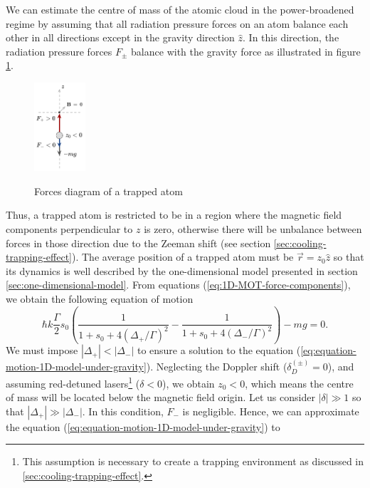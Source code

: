 We can estimate the centre of mass of the atomic cloud in the power-broadened regime by assuming that all radiation pressure forces on an atom balance each other in all directions except in the gravity direction $ \hat{z} $. In this direction, the radiation pressure forces $ F_{\pm} $ balance with the gravity force as illustrated in figure \ref{fig:forces-diagram-trapped-atom-nMOT-power-broadened-regime}.
\begin{figure}[!ht]
    \centering
    \caption{Forces diagram of a trapped atom}
    \includegraphics[width=0.17\textwidth]{USPSC-img/centre_of_mass_power_broadened_regime.png}
    \label{fig:forces-diagram-trapped-atom-nMOT-power-broadened-regime}
    \vspace{-10px}
\end{figure}
Thus, a trapped atom is restricted to be in a region where the magnetic field components perpendicular to $ z $ is zero, otherwise there will be unbalance between forces in those direction due to the Zeeman shift (see section \ref{sec:cooling-trapping-effect}). The average position of a trapped atom must be $ \vec{r} = z_0 \hat{z} $ so that its dynamics is well described by the one-dimensional model presented in section \ref{sec:one-dimensional-model}. From equations (\ref{eq:1D-MOT-force-components}), we obtain the following equation of motion
\begin{equation}
    \hbar k \frac{\Gamma}{2} s_0 \left( \frac{1}{1 + s_0 + 4(\Delta_{+} / \Gamma)^2} - \frac{1}{1 + s_0 + 4(\Delta_{-} / \Gamma)^2}  \right) - mg = 0.
    \label{eq:equation-motion-1D-model-under-gravity}
\end{equation}
We must impose $ |\Delta_{+}| < |\Delta_{-}| $ to ensure a solution to the equation (\ref{eq:equation-motion-1D-model-under-gravity}). Neglecting the Doppler shift ($ \delta_{D}^{(\pm)} = 0 $), and assuming red-detuned lasers\footnote{This assumption is necessary to create a trapping environment as discussed in \ref{sec:cooling-trapping-effect}.} ($ \delta < 0 $), we obtain $ z_0 < 0 $, which means the centre of mass will be located below the magnetic field origin. Let us consider $ |\delta| \gg 1 $ so that $ |\Delta_{+}| \gg |\Delta_{-}| $. In this condition, $ F_{-} $ is negligible. Hence, we can approximate the equation (\ref{eq:equation-motion-1D-model-under-gravity}) to
